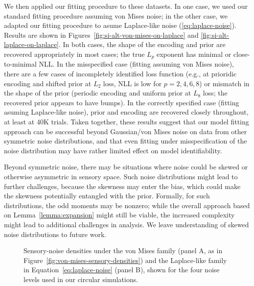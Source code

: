 \documentclass[si.tex]{subfiles}
\begin{document}
We then applied our fitting procedure to these datasets.
In one case, we used our standard fitting procedure assuming von Mises noise; in the other case, we adapted our fitting procedure to asume Laplace-like noise (\ref{eq:laplace-noise}).
Results are shown in Figures~\ref{fig:si-alt-von-mises-on-laplace} and \ref{fig:si-alt-laplace-on-laplace}.
In both cases, the shape of the encoding and prior are recovered appropriately in most cases; the true $L_p$ exponent has minimal or close-to-minimal NLL.
In the misspecified case (fitting assuming von Mises noise), there are a few cases of incompletely identified loss function (e.g., at prioridic encoding and shifted prior at $L_2$ loss, NLL is low for $p=2,4,6,8$) or mismatch in the shape of the prior (periodic encoding and uniform prior at $L_8$ loss; the recovered prior appears to have bumps).
In the correctly specified case (fitting asuming Laplace-like noise), prior and encoding are recovered closely throughout, at least at 40K trials.
Taken together, these results suggest that our model fitting approach can be successful beyond Gaussian/von Mises noise on data from other symmetric noise distributions, and that even fitting under misspecification of the noise distribution may have rather limited effect on model identifiability.

Beyond symmetric noise, there may be situations where noise could be skewed or otherwise asymmetric in sensory space.
Such noise distributions might lead to further challenges, because the skewness may enter the bias, which could make the skewness potentially entangled with the prior.
Formally, for such distributions, the odd moments may be nonzero; while the overall approach based on Lemma~\ref{lemma:expansion} might still be viable, the increased complexity might lead to additional challenges in analysis. We leave understanding of skewed noise distributions to future work.

\begin{figure}[ht]
\centering
{}
\hfill
{}
\caption{Sensory-noise densities under the von Mises family (panel A, as in Figure~\ref{fig:von-mises-sensory-densities}) and the Laplace-like family in Equation~\ref{eq:laplace-noise} (panel B), shown for the four noise levels used in our circular simulations.}
\label{fig:si-alt-von-mises-on-laplace-densities}
\end{figure}
\end{document}
